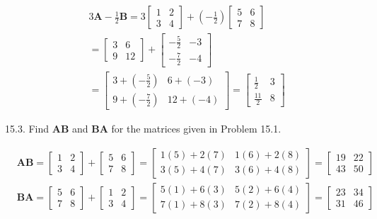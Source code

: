 \documentclass[10pt]{article}
\begin{document}
$$
\begin{aligned}
& 3 \mathbf{A}-\frac{1}{2} \mathbf{B}=3\left[\begin{array}{ll}
1 & 2 \\
3 & 4
\end{array}\right]+\left(-\frac{1}{2}\right)\left[\begin{array}{ll}
5 & 6 \\
7 & 8
\end{array}\right] \\
& =\left[\begin{array}{cc}
3 & 6 \\
9 & 12
\end{array}\right]+\left[\begin{array}{rr}
-\frac{5}{2} & -3 \\
-\frac{7}{2} & -4
\end{array}\right] \\
& =\left[\begin{array}{cc}
3+\left(-\frac{5}{2}\right) & 6+(-3) \\
9+\left(-\frac{7}{2}\right) & 12+(-4)
\end{array}\right]=\left[\begin{array}{cc}
\frac{1}{2} & 3 \\
\frac{11}{2} & 8
\end{array}\right]
\end{aligned}
$$

15.3. Find $\mathbf{A B}$ and $\mathbf{B A}$ for the matrices given in Problem 15.1.

$$
\begin{aligned}
& \mathbf{A B}=\left[\begin{array}{ll}
1 & 2 \\
3 & 4
\end{array}\right]+\left[\begin{array}{ll}
5 & 6 \\
7 & 8
\end{array}\right]=\left[\begin{array}{ll}
1(5)+2(7) & 1(6)+2(8) \\
3(5)+4(7) & 3(6)+4(8)
\end{array}\right]=\left[\begin{array}{ll}
19 & 22 \\
43 & 50
\end{array}\right] \\
& \mathbf{B A}=\left[\begin{array}{ll}
5 & 6 \\
7 & 8
\end{array}\right]+\left[\begin{array}{ll}
1 & 2 \\
3 & 4
\end{array}\right]=\left[\begin{array}{ll}
5(1)+6(3) & 5(2)+6(4) \\
7(1)+8(3) & 7(2)+8(4)
\end{array}\right]=\left[\begin{array}{ll}
23 & 34 \\
31 & 46
\end{array}\right]
\end{aligned}
$$
\end{document}
